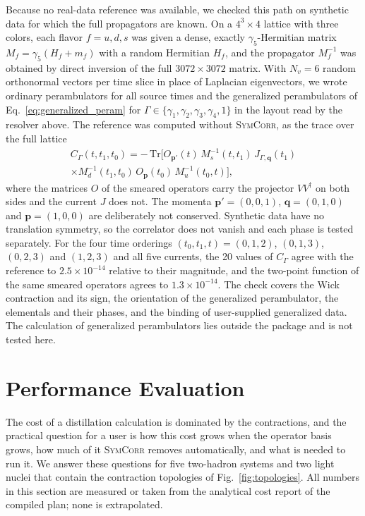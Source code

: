 \documentclass[a4paper,fleqn]{cas-dc}
\begin{document}
Because no real-data reference was available, we checked this path on synthetic
data for which the full propagators are known. On a \(4^3\times4\) lattice with three
colors, each flavor \(f=u,d,s\) was given a dense, exactly \(\gamma_5\)-Hermitian
matrix \(M_f=\gamma_5(H_f+m_f)\) with a random Hermitian \(H_f\), and the propagator
\(M_f^{-1}\) was obtained by direct inversion of the full \(3072\times3072\) matrix.
With \(N_v=6\) random orthonormal vectors per time slice in place of Laplacian
eigenvectors, we wrote ordinary perambulators for all source times and the
generalized perambulators of Eq.~\eqref{eq:generalized_peram} for
\(\Gamma\in\{\gamma_1,\gamma_2,\gamma_3,\gamma_4,1\}\) in the layout read by the
resolver above. The reference was computed without \textsc{SymCorr}, as the trace
over the full lattice
\begin{multline*}
C_\Gamma(t,t_1,t_0)=-\,\mathrm{Tr}\big[O_{\mathbf p'}(t)\,M_s^{-1}(t,t_1)\,
J_{\Gamma,\mathbf q}(t_1)\\
\times M_d^{-1}(t_1,t_0)\,O_{\mathbf p}(t_0)\,M_u^{-1}(t_0,t)\big],
\end{multline*}
where the matrices \(O\) of the smeared operators carry the projector
\(VV^\dagger\) on both sides and the current \(J\) does not. The momenta \(\mathbf p'=(0,0,1)\), \(\mathbf q=(0,1,0)\) and
\(\mathbf p=(1,0,0)\) are deliberately not conserved. Synthetic data have no
translation symmetry, so the correlator does not vanish and each phase is tested
separately. For the four time orderings \((t_0,t_1,t)=(0,1,2)\), \((0,1,3)\),
\((0,2,3)\) and \((1,2,3)\) and all five currents, the 20 values of
\(C_\Gamma\) agree with the reference to \(2.5\times10^{-14}\) relative to their
magnitude, and the two-point function of the same smeared operators agrees to
\(1.3\times10^{-14}\). The check covers the Wick contraction and its sign, the
orientation of the generalized perambulator, the elementals and their phases,
and the binding of user-supplied generalized data. The calculation of generalized
perambulators lies outside the package and is not tested here.
\endgroup

\section{Performance Evaluation}
\label{sec:performance}

The cost of a distillation calculation is dominated by the contractions, and
the practical question for a user is how this cost grows when the operator basis
grows, how much of it \textsc{SymCorr} removes automatically, and what is needed
to run it. We answer these questions for five two-hadron systems and two light
nuclei that contain the contraction topologies of Fig.~\ref{fig:topologies}. All
numbers in this section are measured or taken from the analytical cost report of
the compiled plan; none is extrapolated.
\end{document}
